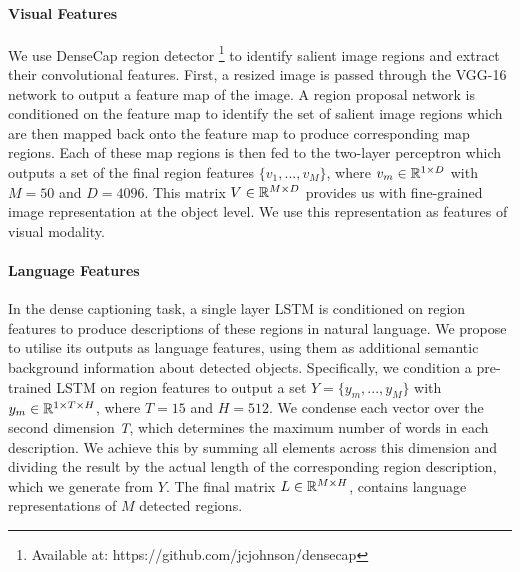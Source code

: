 \documentclass[11pt,a4paper]{article}
\newcommand{\R}{\mathbb{R}}
\begin{document}
\paragraph{Visual Features}
We use DenseCap region detector \cite{densecap}\footnote{Available at: https://github.com/jcjohnson/densecap} to identify salient image regions and extract their convolutional features.
First, a resized image is passed through the VGG-16 network \cite{Simonyan2014} to output a feature map of the image.
A region proposal network is conditioned on the feature map to identify the set of salient image regions which are then mapped back onto the feature map to produce corresponding map regions.
Each of these map regions is then fed to the two-layer perceptron which outputs a set of the final region features ${\{v_1, ..., v_M\}}$, where $v_m \in \R\sp{1 \times D}$ with $M=50$ and $D=4096$.
This matrix $V \in \R\sp{M \times D}$ provides us with fine-grained image representation at the object level.
We use this representation as features of visual modality.

\paragraph{Language Features}
In the dense captioning task, a single layer LSTM is conditioned on region features to produce descriptions of these regions in natural language.
We propose to utilise its outputs as language features, using them as additional semantic background information about detected objects.
Specifically, we condition a pre-trained LSTM on region features to output a set ${Y = \{y_m, ..., y_M\}}$ with $y_m \in \R\sp{1 \times T \times H}$, where $T=15$ and $H=512$.
We condense each vector over the second dimension \textit{T}, which determines the maximum number of words in each description. %
We achieve this by summing all elements across this dimension and dividing the result by the actual length of the corresponding region description, which we generate from $Y$.
The final matrix $L \in \R\sp{M \times H}$, contains language representations of $M$ detected regions.
\end{document}
